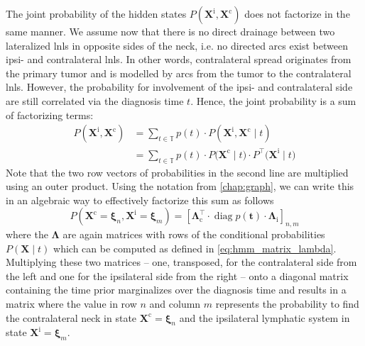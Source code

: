 \documentclass[\relativeRoot/main.tex]{subfiles}
\begin{document}
The joint probability of the hidden states $P \left( \mathbf{X}^\text{i}, \mathbf{X}^\text{c} \right)$ does not factorize in the same manner. We assume now that there is no direct drainage between two lateralized \glspl{lnl} in opposite sides of the neck, i.e. no directed arcs exist between ipsi- and contralateral \glspl{lnl}. In other words, contralateral spread originates from the primary tumor and is modelled by arcs from the tumor to the contralateral \glspl{lnl}. However, the probability for involvement of the ipsi- and contralateral side are still correlated via the diagnosis time $t$. Hence, the joint probability is a sum of factorizing terms:
%
\begin{equation} \label{eq:bilateral:expand:dissect}
    \begin{aligned}
        P \left( \mathbf{X}^\text{i}, \mathbf{X}^\text{c} \right) &= \sum_{t \in \mathbb{T}}{ p(t) \cdot P \left( \mathbf{X}^\text{i}, \mathbf{X}^\text{c} \mid t \right)} \\
        &= \sum_{t \in \mathbb{T}}{ p(t) \cdot P \big( \mathbf{X}^\text{c} \mid t \big) \cdot P^\top \big( \mathbf{X}^\text{i} \mid t \big)}
    \end{aligned}
\end{equation}
%
Note that the two row vectors of probabilities in the second line are multiplied using an outer product. Using the notation from \cref{chap:graph}, we can write this in an algebraic way to effectively factorize this sum as follows
%
\begin{equation} \label{eq:bilateral:expand:algebra}
    P \left( \mathbf{X}^\text{c} = \boldsymbol{\xi}_n, \mathbf{X}^\text{i} = \boldsymbol{\xi}_m \right) = \left[ \boldsymbol{\Lambda}_\text{c}^\top \cdot \operatorname{diag}{p(\mathbf{t})} \cdot \boldsymbol{\Lambda}_\text{i} \right]_{n,m}
\end{equation}
%
where the $\boldsymbol{\Lambda}$ are again matrices with rows of the conditional probabilities $P \left( \mathbf{X} \mid t \right)$ which can be computed as defined in \cref{eq:hmm_matrix_lambda}. Multiplying these two matrices -- one, transposed, for the contralateral side from the left and one for the ipsilateral side from the right -- onto a diagonal matrix containing the time prior marginalizes over the diagnosis time and results in a matrix where the value in row $n$ and column $m$ represents the probability to find the contralateral neck in state $\mathbf{X}^\text{c} = \boldsymbol{\xi}_n$ and the ipsilateral lymphatic system in state $\mathbf{X}^\text{i} = \boldsymbol{\xi}_m$.
\end{document}
